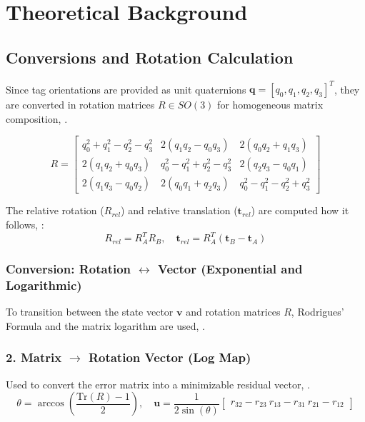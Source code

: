 \newpage
\section{Theoretical Background}

\subsection{Conversions and Rotation Calculation}

Since tag orientations are provided as unit quaternions $\mathbf{q} = [q_0, q_1, q_2, q_3]^T$, they are converted in rotation matrices $R \in SO(3)$ for homogeneous matrix composition, \cite{diebel2006representing}.

\begin{equation}
	R = \begin{bmatrix}
		q_0^2 + q_1^2 - q_2^2 - q_3^2 & 2(q_1q_2 - q_0q_3) & 2(q_0q_2 + q_1q_3) \\
		2(q_1q_2 + q_0q_3) & q_0^2 - q_1^2 + q_2^2 - q_3^2 & 2(q_2q_3 - q_0q_1) \\
		2(q_1q_3 - q_0q_2) & 2(q_0q_1 + q_2q_3) & q_0^2 - q_1^2 - q_2^2 + q_3^2
	\end{bmatrix}
\end{equation}

The relative rotation ($R_{rel}$) and relative translation ($\bm{t}_{rel}$) are computed how it follows, \cite{lynch2017modern}:
\begin{equation}
	R_{rel} = R_A^T R_B, \quad \bm{t}_{rel} = R_A^T (\bm{t}_B - \bm{t}_A)
\end{equation}

\subsubsection{Conversion: Rotation $\leftrightarrow$ Vector (Exponential and Logarithmic)}

To transition between the state vector $\mathbf{v}$ and rotation matrices $R$, Rodrigues' Formula and the matrix logarithm are used, \cite{barfoot2024state}.

\subsubsection{2. Matrix $\to$ Rotation Vector (Log Map)}
Used to convert the error matrix into a minimizable residual vector, \cite{barfoot2024state}.
\begin{equation}
    \theta = \arccos\left(\frac{\text{Tr}(R) - 1}{2}\right), \quad \mathbf{u} = \frac{1}{2\sin(\theta)} \begin{bmatrix} r_{32} - r_{23} \ r_{13} - r_{31} \ r_{21} - r_{12} \end{bmatrix}
\end{equation}


